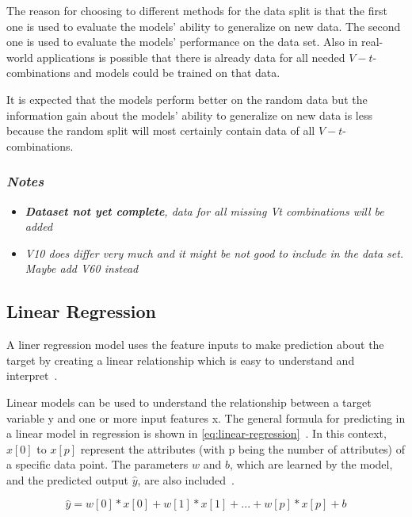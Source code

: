 The reason for choosing to different methods for the data split is that the
first one is used to
evaluate the models'
ability to generalize on new data. The second one is used to evaluate the
models' performance on
the data set.
Also in real-world applications is possible that there is already data for
all needed
$V-t$-combinations and models
could be trained on that data.

It is expected that the models perform better on the random data but the
information gain about
the models' ability
to generalize on new data is less because the random split will most
certainly contain data of
all $V-t$-combinations.

\subsubsection*{\textit{Notes}}
\begin{itemize}
    \item \textit{\textbf{Dataset not yet complete}, data for all missing Vt
    combinations will be
    added}
    \item \textit{V10 does differ very much and it might be not good to
    include in the data set.
    Maybe add V60 instead}
\end{itemize}

\subsection{Linear Regression}\label{subsec:linear-regression}
A liner regression model uses the feature inputs to make prediction about the
target by
creating a linear relationship which is easy to understand and
interpret~\cite[p.
37]{molnar2020interpretable}.

Linear models can be used to understand the relationship between a target
variable y and one or
more input features x.
The general formula for predicting in a linear model in regression is shown in
\ref{eq:linear-regression}~\cite[p.
45]{muller_introductionmachinelearning_2016}.
In this context, $x[0]$ to $x[p]$ represent the attributes (with p being the
number of
attributes) of
a specific data point. The parameters $w$ and $b$, which are learned by the
model, and the predicted
output $\hat{y}$, are also included~\cite[p.
45]{muller_introductionmachinelearning_2016}.

\begin{tcolorbox}[arc=0pt,boxrule=0.5pt]
    \begin{equation}
        \hat{y} = w[0] * x[0] + w[1] * x[1] + ... + w[p] * x[p] + b
    \end{equation}
    \label{eq:linear-regression}
\end{tcolorbox}

